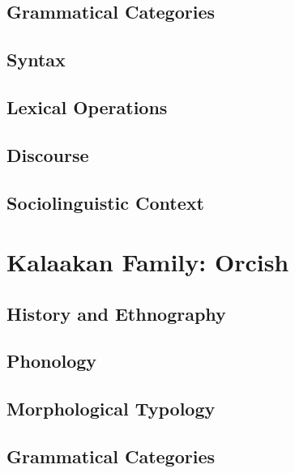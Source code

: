 \documentclass[12pt,letterpaper,openany,twoside]{memoir}
\let\originalpart=\part
\def\part{\cleardoublepage\originalpart}
\begin{document}
\chapter{Grammatical Categories}

\chapter{Syntax}

\chapter{Lexical Operations}

\chapter{Discourse}

\chapter{Sociolinguistic Context}

\part{Kalaakan Family: Orcish}

\chapter{History and Ethnography}

\chapter{Phonology}

\chapter{Morphological Typology}

\chapter{Grammatical Categories}
\end{document}

